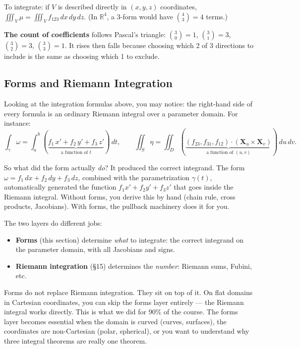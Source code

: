 \documentclass[11pt]{report}
\newcommand{\R}{\mathbb{R}}
\begin{document}
To integrate: if $V$ is described directly in $(x,y,z)$ coordinates, $\iiint_V \mu = \iiint_V f_{123}\,dx\,dy\,dz$. (In $\R^4$, a 3-form would have $\binom{4}{3} = 4$ terms.)

\textbf{The count of coefficients} follows Pascal's triangle: $\binom{3}{0} = 1$, $\binom{3}{1} = 3$, $\binom{3}{2} = 3$, $\binom{3}{3} = 1$. It rises then falls because choosing which 2 of 3 directions to include is the same as choosing which 1 to exclude.

\subsection{Forms and Riemann Integration}

Looking at the integration formulas above, you may notice: the right-hand side of every formula is an ordinary Riemann integral over a parameter domain. For instance:
\[
\int_\gamma \omega = \int_a^b (\underbrace{f_1\, x' + f_2\, y' + f_3\, z'}_{\text{a function of } t})\,dt, \qquad \iint_S \eta = \iint_D (\underbrace{(f_{23}, f_{31}, f_{12}) \cdot (\mathbf{X}_u \times \mathbf{X}_v)}_{\text{a function of } (u,v)})\,du\,dv.
\]

So what did the form actually \textit{do}? It produced the correct integrand. The form $\omega = f_1\,dx + f_2\,dy + f_3\,dz$, combined with the parametrization $\gamma(t)$, automatically generated the function $f_1 x' + f_2 y' + f_3 z'$ that goes inside the Riemann integral. Without forms, you derive this by hand (chain rule, cross products, Jacobians). With forms, the pullback machinery does it for you.

The two layers do different jobs:
\begin{itemize}
    \item \textbf{Forms} (this section) determine \textit{what} to integrate: the correct integrand on the parameter domain, with all Jacobians and signs.
    \item \textbf{Riemann integration} (\S15) determines the \textit{number}: Riemann sums, Fubini, etc.
\end{itemize}

Forms do not replace Riemann integration. They sit on top of it. On flat domains in Cartesian coordinates, you can skip the forms layer entirely --- the Riemann integral works directly. This is what we did for 90\% of the course. The forms layer becomes essential when the domain is curved (curves, surfaces), the coordinates are non-Cartesian (polar, spherical), or you want to understand why three integral theorems are really one theorem.
\end{document}
